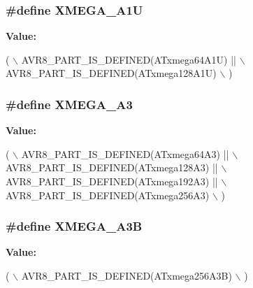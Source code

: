 \subsubsection[{X\+M\+E\+G\+A\+\_\+\+A1\+U}]{\setlength{\rightskip}{0pt plus 5cm}\#define X\+M\+E\+G\+A\+\_\+\+A1\+U}\label{group__xmega__part__macros__group_ga6672329ddee03af905aa378946568b67}
{\bfseries Value\+:}
\begin{DoxyCode}
( \(\backslash\)
        AVR8\_PART\_IS\_DEFINED(ATxmega64A1U)  || \(\backslash\)
        AVR8\_PART\_IS\_DEFINED(ATxmega128A1U) \(\backslash\)
        )
\end{DoxyCode}
\hypertarget{group__xmega__part__macros__group_ga831948bd467aa2355eb76ec708d2921a}{}
\subsubsection[{X\+M\+E\+G\+A\+\_\+\+A3}]{\setlength{\rightskip}{0pt plus 5cm}\#define X\+M\+E\+G\+A\+\_\+\+A3}\label{group__xmega__part__macros__group_ga831948bd467aa2355eb76ec708d2921a}
{\bfseries Value\+:}
\begin{DoxyCode}
( \(\backslash\)
        AVR8\_PART\_IS\_DEFINED(ATxmega64A3)  || \(\backslash\)
        AVR8\_PART\_IS\_DEFINED(ATxmega128A3) || \(\backslash\)
        AVR8\_PART\_IS\_DEFINED(ATxmega192A3) || \(\backslash\)
        AVR8\_PART\_IS\_DEFINED(ATxmega256A3) \(\backslash\)
        )
\end{DoxyCode}
\hypertarget{group__xmega__part__macros__group_ga32fef354d7f092b04ec41a0733e2c7ae}{}
\subsubsection[{X\+M\+E\+G\+A\+\_\+\+A3\+B}]{\setlength{\rightskip}{0pt plus 5cm}\#define X\+M\+E\+G\+A\+\_\+\+A3\+B}\label{group__xmega__part__macros__group_ga32fef354d7f092b04ec41a0733e2c7ae}
{\bfseries Value\+:}
\begin{DoxyCode}
( \(\backslash\)
        AVR8\_PART\_IS\_DEFINED(ATxmega256A3B) \(\backslash\)
        )
\end{DoxyCode}
\hypertarget{group__xmega__part__macros__group_ga98083f3307fe61cc2377948db87cd708}{}
